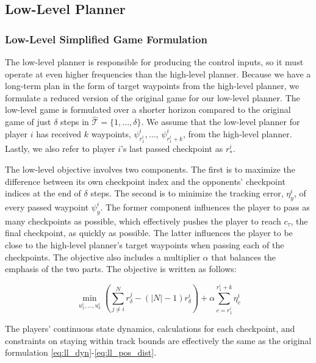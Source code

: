 \subsection{Low-Level Planner}
\subsubsection{Low-Level Simplified Game Formulation}
The low-level planner is responsible for producing the control inputs, so it must operate at even higher frequencies than the high-level planner. Because we have a long-term plan in the form of target waypoints from the high-level planner, we formulate a reduced version of the original game for our low-level planner. The low-level game is formulated over a shorter horizon compared to the original game of just $\delta$ steps in $\hat{\mathcal{T}} = \{1, ..., \delta\}$. We assume that the low-level planner for player $i$ has received $k$ waypoints, $\psi^i_{r^i_{1}}, ..., \, \psi^i_{r^i_{1} + k}$, from the high-level planner. Lastly, we also refer to player $i$'s last passed checkpoint as $r^i_*$. 

The low-level objective involves two components. The first is to maximize the difference between its own checkpoint index and the opponents' checkpoint indices at the end of $\delta$ steps. The second is to minimize the tracking error, $\eta^i_y$, of every passed waypoint $\psi^i_{y}$. The former component influences the player to pass as many checkpoints as possible, which effectively pushes the player to reach $c_\tau$, the final checkpoint, as quickly as possible. The latter influences the player to be close to the high-level planner's target waypoints when passing each of the checkpoints. The objective also includes a multiplier $\alpha$ that balances the emphasis of the two parts. The objective is written as follows:

\begin{equation} \label{eq:ll_obj}
    \min_{u^i_{1}, ..., u^i_{\delta}} (\sum^N_{j \neq i}r^j_{\delta} - (|N|-1) r^i_{\delta}) + \alpha \sum_{c={r^i_{1}}}^{{r^i_{1}}+k} \eta^i_c
\end{equation}

The players' continuous state dynamics, calculations for each checkpoint, and constraints on staying within track bounds  are effectively the same as the original formulation \eqref{eq:ll_dyn}-\eqref{eq:ll_pos_dist}. 

